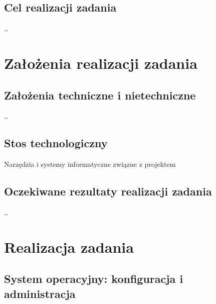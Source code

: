 \documentclass[12pt,a4paper]{article}
\begin{document}
\subsection{Cel realizacji zadania}
\ldots 

\newpage

\section{Założenia realizacji zadania}

\subsection{Założenia techniczne i nietechniczne}
\ldots 

\subsection{Stos technologiczny}
Narzędzia i systemy informatyczne związne z projektem

\subsection{Oczekiwane rezultaty realizacji zadania}
\ldots 

\newpage
\section{Realizacja zadania}

\subsection{System operacyjny: konfiguracja i administracja}
\end{document}
